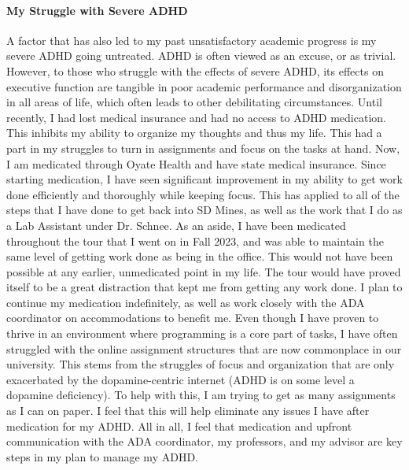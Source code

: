 \documentclass[12pt]{article}
\begin{document}
\paragraph{My Struggle with Severe ADHD}
A factor that has also led to my past unsatisfactory academic progress is my severe 
ADHD going untreated.
ADHD is often viewed as an excuse, or as trivial.
However, to those who struggle with the effects of severe ADHD, its effects on 
executive function are tangible in poor academic performance and disorganization
in all areas of life, which often leads to other debilitating circumstances.
Until recently, I had lost medical insurance and had no access to ADHD medication.
This inhibits my ability to organize my thoughts and thus my life. 
This had a part in my struggles to turn in assignments and focus on the
tasks at hand.
Now, I am medicated through Oyate Health and have state medical insurance. 
Since starting medication, I have seen significant improvement in my ability 
to get work done efficiently and thoroughly while keeping focus.
This has applied to all of the steps that I have done to get back into SD Mines,
as well as the work that I do as a Lab Assistant under Dr. Schnee.
As an aside, I have been medicated throughout the tour that I went on in Fall 2023,
and was able to maintain the same level of getting work done as being in the office.
This would not have been possible at any earlier, unmedicated point in my life. 
The tour would have proved itself to be a great distraction that kept me from getting
any work done.
I plan to continue my medication indefinitely, as well as work closely with the 
ADA coordinator on accommodations to benefit me.
Even though I have proven to thrive in an environment where programming is a 
core part of tasks, I have often struggled with the online assignment structures 
that are now commonplace in our university. 
This stems from the struggles of focus and organization that are only exacerbated
by the dopamine-centric internet 
(ADHD is on some level a dopamine deficiency).
To help with this, I am trying to get as many assignments as I can on paper.
I feel that this will help eliminate any issues I have after medication for my ADHD.
All in all, I feel that medication and upfront communication with the ADA coordinator, 
my professors, and my advisor are key steps in my plan to manage my ADHD.
\end{document}
